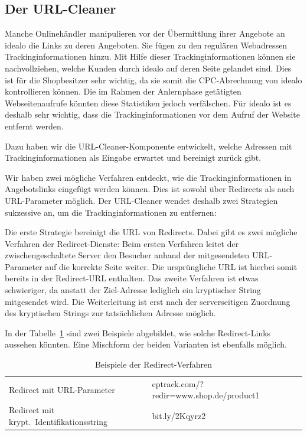 \subsection{Der URL-Cleaner}
\label{subsec:urlcleaner}

Manche Onlinehändler manipulieren vor der Übermittlung ihrer Angebote an idealo die Links zu deren Angeboten.
Sie fügen zu den regulären Webadressen Trackinginformationen hinzu.
Mit Hilfe dieser Trackinginformationen können sie nachvollziehen, welche Kunden durch idealo auf deren Seite gelandet
sind.
Dies ist für die Shopbesitzer sehr wichtig, da sie somit die CPC-Abrechnung von idealo kontrollieren können.
Die im Rahmen der Anlernphase getätigten Webseitenaufrufe könnten diese Statistiken jedoch verfälschen.
Für idealo ist es deshalb sehr wichtig, dass die Trackinginformationen vor dem Aufruf der Website entfernt werden.

Dazu haben wir die URL-Cleaner-Komponente entwickelt, welche Adressen mit Trackinginformationen als Eingabe erwartet und
bereinigt zurück gibt.

Wir haben zwei mögliche Verfahren entdeckt, wie die Trackinginformationen in Angebotslinks eingefügt werden können.
Dies ist sowohl über Redirects als auch URL-Parameter möglich.
Der URL-Cleaner wendet deshalb zwei Strategien sukzessive an, um die Trackinginformationen zu entfernen:

Die erste Strategie bereinigt die URL von Redirects.
Dabei gibt es zwei mögliche Verfahren der Redirect-Dienste:
Beim ersten Verfahren leitet der zwischengeschaltete Server den Besucher anhand der mitgesendeten URL-Parameter auf
die korrekte Seite weiter.
Die ursprüngliche URL ist hierbei somit bereits in der Redirect-URL enthalten.
Das zweite Verfahren ist etwas schwieriger, da anstatt der Ziel-Adresse lediglich ein kryptischer String mitgesendet
wird.
Die Weiterleitung ist erst nach der serverseitigen Zuordnung des kryptischen Strings zur tatsächlichen Adresse möglich.

In der Tabelle~\ref{tab:redirect} sind zwei Beispiele abgebildet, wie solche Redirect-Links aussehen könnten.
Eine Mischform der beiden Varianten ist ebenfalls möglich.

\begin{table}[h]
    \centering
    \begin{tabular}{ l | l }
        Redirect mit URL-Parameter                  &   cptrack.com/?redir=www.shop.de/product1\\
        Redirect mit krypt.\ Identifikationsstring   &   bit.ly/2Kqyrz2
    \end{tabular}
    \caption{Beispiele der Redirect-Verfahren}
    \label{tab:redirect}
\end{table}

